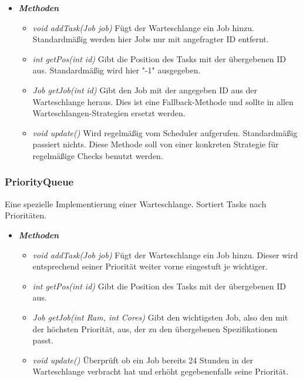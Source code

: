 \documentclass[a4paper,12pt]{article}
\begin{document}
\begin{itemize}[label={}]

\item \textit{\textbf{Methoden}}
\begin{itemize}[label={\textbullet}]
	
	\item \textit{void addTask(Job job)} Fügt der Warteschlange ein Job hinzu. Standardmäßig werden hier Jobs nur mit angefragter ID entfernt.

\item \textit{int getPos(int id)} Gibt die Position des Tasks mit der übergebenen ID aus. Standardmäßig wird hier "-1" ausgegeben.

\item \textit{Job getJob(int id)} Gibt den Job mit der angegeben ID aus der Warteschlange heraus. Dies ist eine Fallback-Methode und sollte in allen Warteschlangen-Strategien ersetzt werden. 

\item \textit{void update()} Wird regelmäßig vom Scheduler aufgerufen. Standardmäßig passiert nichts. Diese Methode soll von einer konkreten Strategie für regelmäßige Checks benutzt werden.

\end{itemize}

\end{itemize}

\subsubsection{PriorityQueue}

Eine spezielle Implementierung einer Warteschlange. Sortiert Tasks nach Prioritäten.

\begin{itemize}[label={}]

\item \textit{\textbf{Methoden}}
\begin{itemize}[label={\textbullet}]

\item \textit{void addTask(Job job)} Fügt der Warteschlange ein Job hinzu. Dieser wird entsprechend seiner Priorität weiter vorne eingestuft je wichtiger.

\item \textit{int getPos(int id)} Gibt die Position des Tasks mit der übergebenen ID aus.

\item \textit{Job getJob(int Ram, int Cores)} Gibt den wichtigsten Job, also den mit der höchsten Priorität,  aus, der zu den übergebenen Spezifikationen passt.

\item \textit{void update()} Überprüft ob ein Job bereits 24 Stunden in der Warteschlange verbracht hat und erhöht gegebenenfalls seine Priorität.

\end{itemize}

\end{itemize}
\end{document}
